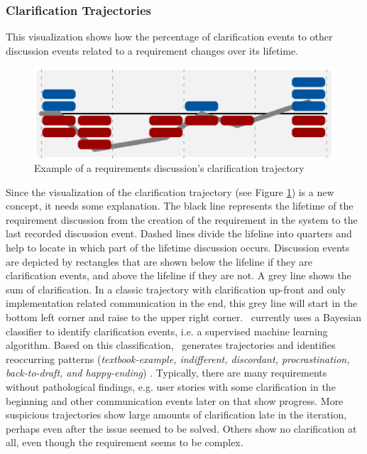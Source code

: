 \subsubsection{Clarification Trajectories} 
This visualization shows how the percentage of clarification events to other discussion events related to a requirement changes over its lifetime.
\begin{figure}[b]
\centering
\includegraphics[width=0.51\columnwidth]{img/example-trajectory}
\caption{Example of a requirements discussion's clarification trajectory}
\label{fig:example-trajectory}
\end{figure}
Since the visualization of the clarification trajectory (see Figure \ref{fig:example-trajectory}) is a new concept, it needs some explanation.
The black line represents the lifetime of the requirement discussion from the creation of the requirement in the system to the last recorded discussion event.
Dashed lines divide the lifeline into quarters and help to locate in which part of the lifetime discussion occurs.
Discussion events are depicted by rectangles that are shown below the lifeline if they are clarification events, and above the lifeline if they are not.
A grey line shows the sum of clarification.
In a classic trajectory with clarification up-front and only implementation related communication in the end, this grey line will start in the bottom left corner and raise to the upper right corner.
\viss\ currently uses a Bayesian classifier to identify clarification events, i.e. a supervised machine learning algorithm.
Based on this classification, \viss\ generates trajectories and identifies reoccurring patterns (\emph{textbook-example, indifferent, discordant, procrastination, back-to-draft, and happy-ending}) \cite{Knauss2012f}.
Typically, there are many requirements without pathological findings, e.g. user stories with some clarification in the beginning and other communication events later on that show progress.
More suspicious trajectories show large amounts of clarification late in the iteration, perhaps even after the issue seemed to be solved. Others show no clarification at all, even though the requirement seems to be complex.
